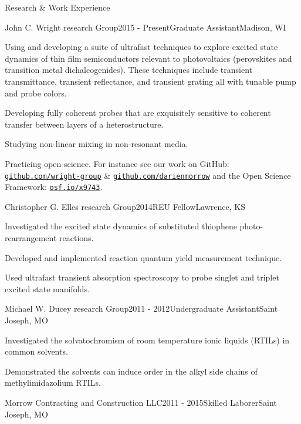 \documentclass{resume} %
\begin{document}
\begin{rSection}{Research \& Work Experience}

\begin{rSubsection}{John C. Wright research Group}{2015 - Present}{Graduate Assistant}{Madison, WI}
\item Using and developing a suite of ultrafast techniques to explore excited state dynamics of thin film semiconductors relevant to photovoltaics (perovskites and transition metal dichalcogenides). These techniques include transient transmittance, transient reflectance, and transient grating all with tunable pump and probe colors.
\item Developing fully coherent probes that are exquisitely sensitive to coherent transfer between layers of a heterostructure. 
\item Studying non-linear mixing in non-resonant media.
\item Practicing open science. For instance see our work on GitHub: \href{http://github.com/wright-group}{\texttt{github.com/wright-group}} \& \href{https://github.com/darienmorrow}{\texttt{github.com/darienmorrow}} and the Open Science Framework: \href{http://osf.io/x9743/}{\texttt{osf.io/x9743}}.

\end{rSubsection}

\begin{rSubsection}{Christopher G. Elles research Group}{2014}{REU Fellow}{Lawrence, KS}
	\item Investigated the excited state dynamics of substituted thiophene photo-rearrangement reactions.
	\item Developed and implemented reaction quantum yield measurement technique.
	\item Used ultrafast transient absorption spectroscopy to probe singlet and triplet excited state manifolds. 
\end{rSubsection}

\begin{rSubsection}{Michael W. Ducey research Group}{2011 - 2012}{Undergraduate Assistant}{Saint Joseph, MO}
	\item Investigated the solvatochromism of room temperature ionic liquids (RTILs) in common solvents. 
	\item Demonstrated the solvents can induce order in the alkyl side chains of methylimidazolium RTILs.
\end{rSubsection}

\begin{rSubsectionlistless}{Morrow Contracting and Construction LLC}{2011 - 2015}{Skilled Laborer}{Saint Joseph, MO}
\end{rSubsectionlistless}

\end{rSection}
\end{document}
